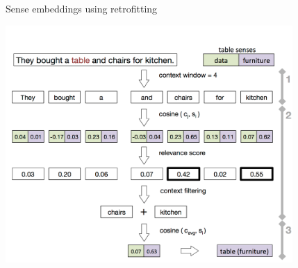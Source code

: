 	
\begin{frame}{Sense embeddings using retrofitting}
\vspace{-3em}
	\begin{center}
		\includegraphics[width=0.82\textwidth]{figures/wsd}
	\end{center}
	
\end{frame}




